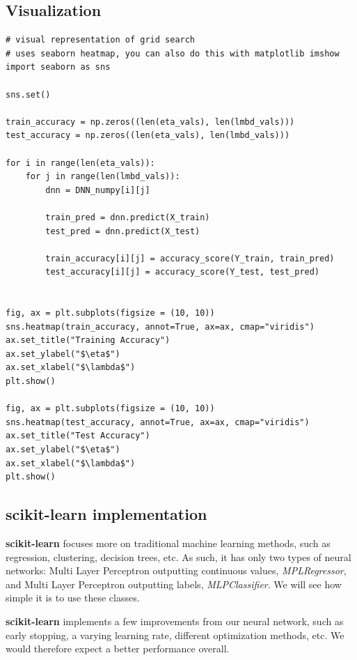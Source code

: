 \documentclass[%
oneside,                 %
final,                   %
10pt]{article}
\begin{document}
\subsection*{Visualization}

\begin{verbatim}
# visual representation of grid search
# uses seaborn heatmap, you can also do this with matplotlib imshow
import seaborn as sns

sns.set()

train_accuracy = np.zeros((len(eta_vals), len(lmbd_vals)))
test_accuracy = np.zeros((len(eta_vals), len(lmbd_vals)))

for i in range(len(eta_vals)):
    for j in range(len(lmbd_vals)):
        dnn = DNN_numpy[i][j]
        
        train_pred = dnn.predict(X_train) 
        test_pred = dnn.predict(X_test)

        train_accuracy[i][j] = accuracy_score(Y_train, train_pred)
        test_accuracy[i][j] = accuracy_score(Y_test, test_pred)

        
fig, ax = plt.subplots(figsize = (10, 10))
sns.heatmap(train_accuracy, annot=True, ax=ax, cmap="viridis")
ax.set_title("Training Accuracy")
ax.set_ylabel("$\eta$")
ax.set_xlabel("$\lambda$")
plt.show()

fig, ax = plt.subplots(figsize = (10, 10))
sns.heatmap(test_accuracy, annot=True, ax=ax, cmap="viridis")
ax.set_title("Test Accuracy")
ax.set_ylabel("$\eta$")
ax.set_xlabel("$\lambda$")
plt.show()
\end{verbatim}

\subsection*{scikit-learn implementation}

\textbf{scikit-learn} focuses more
on traditional machine learning methods, such as regression,
clustering, decision trees, etc. As such, it has only two types of
neural networks: Multi Layer Perceptron outputting continuous values,
\emph{MPLRegressor}, and Multi Layer Perceptron outputting labels,
\emph{MLPClassifier}. We will see how simple it is to use these classes.

\textbf{scikit-learn} implements a few improvements from our neural network,
such as early stopping, a varying learning rate, different
optimization methods, etc. We would therefore expect a better
performance overall.
\end{document}
